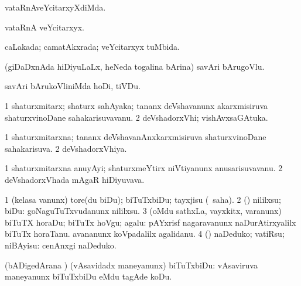 \bentry
{}
\gl{\kirxvi}
\bmng
vataRnAveYcitarxyXdiMda. 
\emng
\eentry

\bentry
{}
\gl{\nA}
\bmng
vataRnA veYcitarxyx. 
\emng
\eentry

\bentry
{}
\gl{\gu}
\bmng
caLakada; camatAkxrada; veYcitarxyx tuMbida. 
\emng
\eentry

\bentry
{}
\gl{\nA}
\bmng
(giDaDxnAda hiDiyuLaLx, heNeda togalina bArina) savAri bArugoVlu. 
\emng
\eentry

\bentry
{}
\gl{\sakirx}
\bmng
savAri bArukoVliniMda hoDi, tiVDu. 
\emng
\eentry

\bentry
{}
\gl{\nA}
\bmng
\bnum
\num{1} shaturxmitarx; shaturx sahAyaka; tananx deVshavanunx akarxmisiruva shaturxvinoDane sahakarisuvavanu. 
\num{2} deVshadorxVhi; vishAvxsaGAtuka. 
\enum
\emng
\eentry

\bentry
{}
\gl{\gu}
\bmng
\bnum
\num{1} shaturxmitarxna; tananx deVshavanAnxkarxmisiruva shaturxvinoDane sahakarisuva. 
\num{2} deVshadorxVhiya. 
\enum
\emng
\eentry

\bentry
{}
\gl{\nA}
\expl{}
\bmng
\bnum
\num{1} shaturxmitarxna anuyAyi; shaturxmeYtirx niVtiyanunx anusarisuvavanu. 
\num{2} deVshadorxVhada mAgaR hiDiyuvava. 
\enum
\emng
\eentry

\bentry
{}
\gl{\kirx}
\bmng
\emng

\noindent
\gl{\sakirx}
\bmng
\bnum
\num{1} (kelasa \mo vanunx) tore(du biDu); biTuTxbiDu; tayxjisu (\akirx\ saha). 
\num{2} (\ame) nililxsu; biDu:  goNaguTuTxvudanunx nililxsu. 
\num{3} (oMdu sathxLa, vayxkitx, \mo varanunx) biTuTX horaDu; biTuTx hoVgu; agalu:  pAYxrisf nagaravanunx naDurAtirxyalilx biTuTx horaTanu.  avananunx koVpadalilx agalidanu. 
\num{4} (\AtAmx) naDeduko; vatiRsu; niBAyisu:  cenAnxgi naDeduko. 
\enum
\emng

\noindent
\gl{\akirx}
\bmng
(bADigedArana \vi) (vAsavidadx maneyanunx) biTuTxbiDu:  vAsaviruva maneyanunx biTuTxbiDu eMdu tagAde koDu. 
\emng

